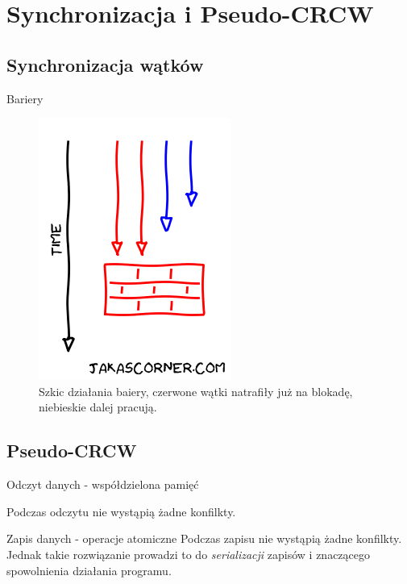\documentclass{if-beamer}
\begin{document}
\section{Synchronizacja i Pseudo-CRCW}

\subsection{Synchronizacja wątków}

\begin{frame}{Bariery}


\begin{figure}
\centering
\includegraphics[scale=0.4]{bariera.png}
\caption{Szkic działania baiery, czerwone wątki natrafiły już na blokadę, niebieskie dalej pracują.}
\end{figure}

\end{frame}

\subsection{Pseudo-CRCW}

\begin{frame}{Odczyt danych - współdzielona pamięć}

\centering
Podczas odczytu nie wystąpią żadne konfilkty.

\end{frame}

\begin{frame}{Zapis danych - operacje atomiczne}
\centering
Podczas zapisu nie wystąpią żadne konfilkty. Jednak takie rozwiązanie prowadzi to do \emph{serializacji} zapisów i znaczącego spowolnienia działania programu.

\end{frame}
\end{document}
